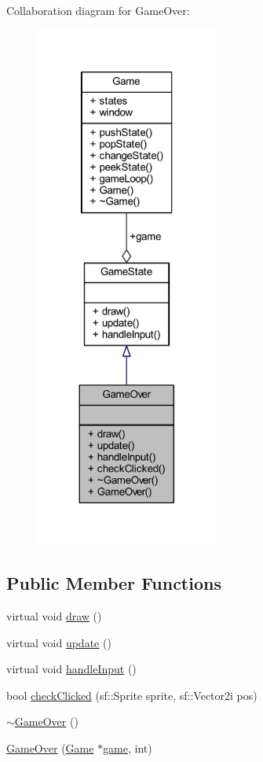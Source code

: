 Collaboration diagram for Game\+Over\+:
\nopagebreak
\begin{figure}[H]
\begin{center}
\leavevmode
\includegraphics[width=170pt]{class_game_over__coll__graph}
\end{center}
\end{figure}
\subsection*{Public Member Functions}
\begin{DoxyCompactItemize}
\item 
virtual void \hyperlink{class_game_over_a250dc52de3aed814575b8f2df3ecbb06}{draw} ()
\item 
virtual void \hyperlink{class_game_over_a69f9e1364ff7caa8b17184441474c8b7}{update} ()
\item 
virtual void \hyperlink{class_game_over_acec786fec9ee289c9fab95b3b067efd0}{handle\+Input} ()
\item 
bool \hyperlink{class_game_over_a7239e22d93ea5a1374b5b75af3ed7ed6}{check\+Clicked} (sf\+::\+Sprite sprite, sf\+::\+Vector2i pos)
\item 
\hyperlink{class_game_over_ae36951a153d25d52fab7cbc7a85bbbbd}{$\sim$\+Game\+Over} ()
\item 
\hyperlink{class_game_over_aa3f05675e69ff44ac0f4edab4f3c2f14}{Game\+Over} (\hyperlink{class_game}{Game} $\ast$\hyperlink{class_game_state_a355a79415b9ef63c2aec1448a99f6e71}{game}, int)
\end{DoxyCompactItemize}
